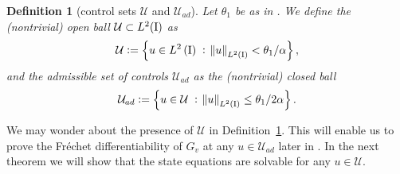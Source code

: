 \documentclass[final]{siamltex}
\newtheorem{defn}[theorem]{Definition}
\begin{document}
\begin{defn}[control sets ${\mathcal{U}}$ and ${{\mathcal{U}_{ad}}}$]\label{defn:const_set}
Let $\theta_1$ be as in . We define 
the (nontrivial) open ball ${\mathcal{U}} \subset L^2({\text{\rm I}})$ as
\begin{equation}    \label{eq:open_ball}
{\mathcal{U}} := \set{ u \in {{L^2\del{{\text{\rm I}}}}}\;:\; {\norm{{u}}_{{L^2\del{{{\text{\rm I}}}}}}} < \theta_1 /\alpha} ,
\end{equation}
and the admissible set of controls ${{\mathcal{U}_{ad}}}$ as the (nontrivial) closed ball
\begin{equation}    \label{eq:v_u_const_set}
{{\mathcal{U}_{ad}}} := \set{ u \in {\mathcal{U}} \;:\; {\norm{{u}}_{{L^2\del{{{\text{\rm I}}}}}}} \leq \theta_1 /2\alpha}.
\end{equation}
\end{defn}

We may wonder about the presence of ${\mathcal{U}}$ in Definition~\ref{defn:const_set}. This will enable us to prove the
Fr\'echet differentiability of $G_v$ at any $u \in {{\mathcal{U}_{ad}}}$ later in . In the next theorem we will show that the state equations are solvable for any $ u \in {\mathcal{U}}$.
\end{document}
